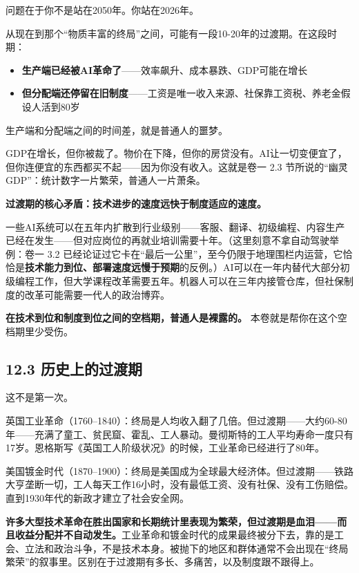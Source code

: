 \documentclass[11pt,a4paper]{ctexart}
\begin{document}
问题在于你不是站在2050年。你站在2026年。

从现在到那个“物质丰富的终局”之间，可能有一段10-20年的过渡期。在这段时期：

\begin{itemize}
  \item \textbf{生产端已经被AI革命了}——效率飙升、成本暴跌、GDP可能在增长
  \item \textbf{但分配端还停留在旧制度}——工资是唯一收入来源、社保靠工资税、养老金假设人活到80岁
\end{itemize}

生产端和分配端之间的时间差，就是普通人的噩梦。

GDP在增长，但你被裁了。物价在下降，但你的房贷没有。AI让一切变便宜了，但你连便宜的东西都买不起——因为你没有收入。这就是卷一 2.3 节所说的“幽灵GDP”：统计数字一片繁荣，普通人一片萧条。

\textbf{过渡期的核心矛盾：技术进步的速度远快于制度适应的速度。}

一些AI系统可以在五年内扩散到行业级别——客服、翻译、初级编程、内容生产已经在发生——但对应岗位的再就业培训需要十年。（这里刻意不拿自动驾驶举例：卷一 3.2 已经论证过它卡在“最后一公里”，至今仍限于地理围栏内运营，它恰恰是\textbf{技术能力到位、部署速度远慢于预期}的反例。）AI可以在一年内替代大部分初级编程工作，但大学课程改革需要五年。机器人可以在三年内接管仓库，但社保制度的改革可能需要一代人的政治博弈。

\textbf{在技术到位和制度到位之间的空档期，普通人是裸露的。} 本卷就是帮你在这个空档期里少受伤。

\subsection{12.3 历史上的过渡期}

这不是第一次。

英国工业革命（1760--1840）：终局是人均收入翻了几倍。但过渡期——大约60-80年——充满了童工、贫民窟、霍乱、工人暴动。曼彻斯特的工人平均寿命一度只有17岁。恩格斯写《英国工人阶级状况》的时候，工业革命已经进行了80年。

美国镀金时代（1870--1900）：终局是美国成为全球最大经济体。但过渡期——铁路大亨垄断一切，工人每天工作16小时，没有最低工资、没有社保、没有工伤赔偿。直到1930年代的新政才建立了社会安全网。

\textbf{许多大型技术革命在胜出国家和长期统计里表现为繁荣，但过渡期是血泪——而且收益分配并不自动发生。}工业革命和镀金时代的成果最终被分下去，靠的是工会、立法和政治斗争，不是技术本身。被抛下的地区和群体通常不会出现在“终局繁荣”的叙事里。区别在于过渡期有多长、多痛苦，以及制度跟不跟得上。
\end{document}

